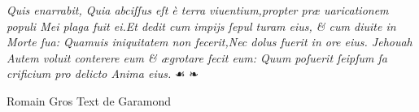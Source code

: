 \documentclass{article}
\begin{document}
{\begin{multicols}{2}
	\justifying
	\noindent
	\textit{Quis enarrabit, Quia abciſſus eſt \`e terra viuentium,propter pr\ae{} \linebreak
	uaricationem populi Mei plaga fuit ei.Et dedit cum impijs ſepul\linebreak
	turam eius, \& cum diuite in Morte ſua: Quamuis iniquitatem\linebreak
	non fecerit,Nec dolus fuerit in ore eius. Jehouah Autem voluit\linebreak
	conterere eum \& \ae{}grotare fecit eum: {Quum} poſuerit ſeipſum ſa\linebreak
	crificium pro delicto Anima eius.}  {\normalfont \fontsize{9}{7}\selectfont \quad ☙ ❧}
\end{multicols}
\vspace{-3\baselineskip}
\begin{multicols}{2}
	\tiny
	\centering
	Romain Gros Text de Garamond\\
	\vspace{0.5\baselineskip}
	\small
	\justifying
	\noindent {}


\end{multicols}}
\end{document}
